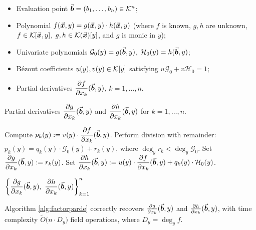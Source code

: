 \documentclass{article}
\numberwithin{equation}{section}
\begin{document}
\begin{algorithm}
\caption{Factor Partial Derivative Algorithm}
\label{alg:factorparde}
\begin{algorithmic}[1]
\Require
    \begin{itemize}
        \item Evaluation point $\vec{\boldsymbol{b}}=(b_1, \dots, b_n) \in {\mathcal{K}}^n$;
        \item Polynomial $f(\vec{\boldsymbol{x}},y) = g(\vec{\boldsymbol{x}},y) \cdot h(\vec{\boldsymbol{x}},y)$ (where $f$ is known, $g,h$ are unknown, $f\in {\mathcal{K}}[\vec{\boldsymbol{x}},y]$, $g,h\in {\mathcal{K}}(\vec{\boldsymbol{x}})[y]$, and $g$ is monic in $y$);
        \item Univariate polynomials $\mathcal{G}_0(y) = g(\vec{\boldsymbol{b}},y)$, $\mathcal{H}_0(y) = h(\vec{\boldsymbol{b}},y)$;
        \item B\'ezout coefficients $u(y), v(y) \in {\mathcal{K}}[y]$ satisfying $u \mathcal{G}_0 + v \mathcal{H}_0 = 1$;
        \item Partial derivatives $\dfrac{\partial f}{\partial x_k}(\vec{\boldsymbol{b}},y)$, $k = 1, \dots, n$.
    \end{itemize}
\Ensure
    Partial derivatives $\dfrac{\partial g}{\partial x_k}(\vec{\boldsymbol{b}},y)$ and $\dfrac{\partial h}{\partial x_k}(\vec{\boldsymbol{b}},y)$ for $k = 1, \dots, n$.

    \State Compute $p_k(y) := v(y) \cdot \dfrac{\partial f}{\partial x_k}(\vec{\boldsymbol{b}},y)$.
    \State Perform division with remainder: $p_k(y) = q_k(y) \cdot \mathcal{G}_0(y) + r_k(y)$, where $\deg_y r_k < \deg_y \mathcal{G}_0$.
    \State Set $\dfrac{\partial g}{\partial x_k}(\vec{\boldsymbol{b}},y) := r_k(y)$.
    \State Set $\dfrac{\partial h}{\partial x_k}(\vec{\boldsymbol{b}},y) := u(y) \cdot \dfrac{\partial f}{\partial x_k}(\vec{\boldsymbol{b}},y) + q_k(y) \cdot \mathcal{H}_0(y)$.
\EndFor

\State \Return $\left\{ \dfrac{\partial g}{\partial x_k}(\vec{\boldsymbol{b}},y),\ \dfrac{\partial h}{\partial x_k}(\vec{\boldsymbol{b}},y) \right\}_{k=1}^{n}$
\end{algorithmic}
\end{algorithm}




\begin{theorem}
Algorithm \ref{alg:factorparde} correctly recovers $\frac{\partial g}{\partial x_k}(\vec{\boldsymbol{b}},y)$ and $\frac{\partial h}{\partial x_k}(\vec{\boldsymbol{b}},y)$, with time complexity
$
\widetilde{O}\bigl(n \cdot D_y\bigr)
$
field operations, where $D_y = \deg_y f$.
\end{theorem}
\end{document}
